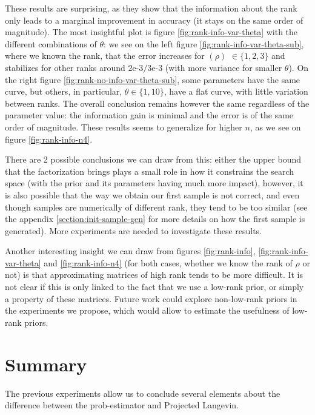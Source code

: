 \documentclass[12pt]{memoir}
\newcommand{\rhorank}[0]{\text{rank}$(\rho) $ }
\begin{document}
These results are surprising, as they show that the information about the rank only leads to a marginal improvement in accuracy (it stays on the same order of magnitude). The most insightful plot is figure \ref{fig:rank-info-var-theta} with the different combinations of $\theta$: we see on the left figure \ref{fig:rank-info-var-theta-sub}, where we known the rank, that the error increases for \rhorank{$\in \{1,2,3\}$} and stabilizes for other ranks around $2\text{e-}3/3\text{e-}3$ (with more variance for smaller $\theta$). On the right figure \ref{fig:rank-no-info-var-theta-sub}, some parameters have the same curve, but others, in particular, $\theta \in\{1,10\}$, have a flat curve, with little variation between ranks. The overall conclusion remains however the same regardless of the parameter value: the information gain is minimal and the error is of the same order of magnitude.
These results seems to generalize for higher $n$, as we see on figure \ref{fig:rank-info-n4}. \medbreak

There are 2 possible conclusions we can draw from this: either the upper bound that the factorization brings plays a small role in how it constrains the search space (with the prior and its parameters having much more impact), however, it is also possible that the way we obtain our first sample is not correct, and even though samples are numerically of different rank, they tend to be too similar (see the appendix \ref{section:init-sample-gen} for more details on how the first sample is generated). More experiments are needed to investigate these results.\medbreak

Another interesting insight we can draw from figures \ref{fig:rank-info}, \ref{fig:rank-info-var-theta} and \ref{fig:rank-info-n4} (for both cases, whether we know the rank of $\rho$ or not) is that approximating matrices of high rank tends to be more difficult. It is not clear if this is only linked to the fact that we use a low-rank prior, or simply a property of these matrices. Future work could explore non-low-rank priors in the experiments we propose, which would allow to estimate the usefulness of low-rank priors.

\section{Summary}
The previous experiments allow us to conclude several elements about the difference between the prob-estimator and Projected Langevin. \medbreak
\end{document}
